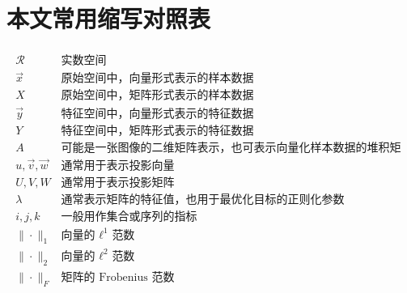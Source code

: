 \chapter{本文常用缩写对照表}

\begin{center}
	
	\begin{eqnarray*}
		\begin{array}{ll}
			\mathcal{R} & \text{实数空间} \\
			\Vec{x} & \text{原始空间中，向量形式表示的样本数据} \\
			{X} & \text{原始空间中，矩阵形式表示的样本数据} \\
			\Vec{y} & \text{特征空间中，向量形式表示的特征数据} \\
			{Y} & \text{特征空间中，矩阵形式表示的特征数据} \\
			{A} & \text{可能是一张图像的二维矩阵表示，也可表示向量化样本数据的堆积矩阵} \\
			{u},\Vec{v},\Vec{w} & \text{通常用于表示投影向量} \\
			{U},{V},{W} & \text{通常用于表示投影矩阵} \\
			\lambda & \text{通常表示矩阵的特征值，也用于最优化目标的正则化参数} \\
			i, j, k & \text{一般用作集合或序列的指标} \\
			\| \cdot \|_1 & \text{向量的 $\ell^1$ 范数} \\
			\| \cdot \|_2 & \text{向量的 $\ell^2$ 范数} \\
			\| \cdot \|_F & \text{矩阵的 Frobenius 范数} \\
		\end{array}
	\end{eqnarray*}
	
\end{center}